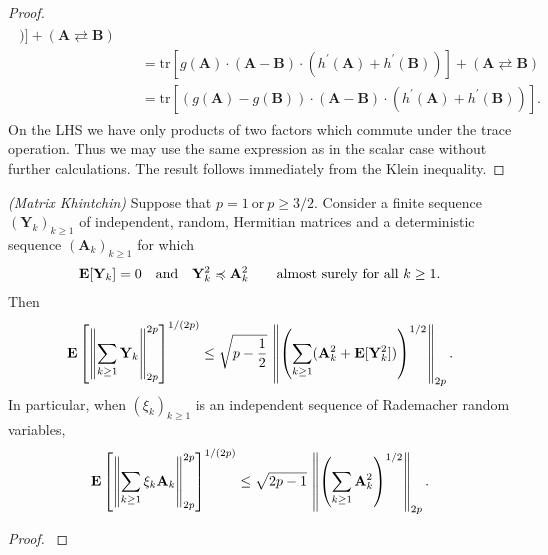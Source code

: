 \begin{proof}
\begin{align}
\begin{split}
    )
  ]
  +
  (\mathbf{A} \rightleftarrows \mathbf{B})
  \\
  &\quad=
  \mathrm{tr}
  [
    g(\mathbf{A})
    \cdot
    (
    \mathbf{A}
    -
    \mathbf{B}
    )
    \cdot
    (
    h^{'}(\mathbf{A})
    +
    h^{'}(\mathbf{B})
    )
  ]
  +
  (\mathbf{A} \rightleftarrows \mathbf{B})
  \\
  &\quad=
  \mathrm{tr}
  [
  (
    g(\mathbf{A})
    -
    g(\mathbf{B})
  )
    \cdot
    (
    \mathbf{A}
    -
    \mathbf{B}
    )
    \cdot
    (
    h^{'}(\mathbf{A})
    +
    h^{'}(\mathbf{B})
    )
  ].
    \end{split}
  \end{align}
  On the LHS we have only products of two factors which commute under the trace operation. Thus we may use the same expression as in the scalar case without further calculations.
  The result follows immediately from the Klein inequality.
\end{proof}






\begin{ftheorem}
  \emph{(Matrix Khintchin)}
  Suppose that
  $
    p = 1
    \ 
    \text{or}\ 
    p \ge 3/2
    .
  $
  Consider a finite sequence
  $
    (\mathbf{Y}_k)_{k\ge 1}
  $
  of independent, random, Hermitian matrices 
  and a deterministic sequence
  $
    (\mathbf{A}_k)_{k\ge 1}
  $
  for which
  \begin{gather}
    \E[\mathbf{Y}_k]
    =
    0
    \quad 
    \text{and}
    \quad
    \mathbf{Y}_k^2
    \preccurlyeq
    \mathbf{A}_k^2
    \qquad
    \text{almost surely for all}\ 
    k \ge 1.
  \end{gather}
  Then
  \begin{gather}
      \mathbf{E}
      \left[
        \left\lVert
          \sum_{k\ge 1}
            \mathbf{Y}_k
        \right\rVert
        _{2p}
        ^{2p}
      \right]
      ^{1/(2p)}
      \le
      \sqrt{
        p - \frac{1}{2}
      }
      \,
      \left\lVert
        \left( 
          \sum_{k\ge 1}
          (
            \mathbf{A}_k^2
            + 
            \mathbf{E}[
              \mathbf{Y}_k^2
            ]
          )
        \right)
        ^{1/2}
        \right\rVert
      _{2p}
      .
  \end{gather}
  In particular, when 
  $
    (\xi_k)_{k\ge 1}
  $
  is an independent sequence of Rademacher random variables,
  \begin{gather}
      \mathbf{E}
      \left[
        \left\lVert
          \sum_{k\ge 1}
            \xi_k
            \mathbf{A}_k
        \right\rVert
        _{2p}
        ^{2p}
      \right]
      ^{1/(2p)}
      \le
      \sqrt{
        2p - 1
        }
      \,
      \left\lVert
        \left( 
          \sum_{k\ge 1}
            \mathbf{A}_k^2
        \right)
        ^{1/2}
        \right\rVert
      _{2p}
      .
  \end{gather}
\end{ftheorem}
\begin{proof}
  \cite[Corollary~7.3]{Mackey2014}
\end{proof}

